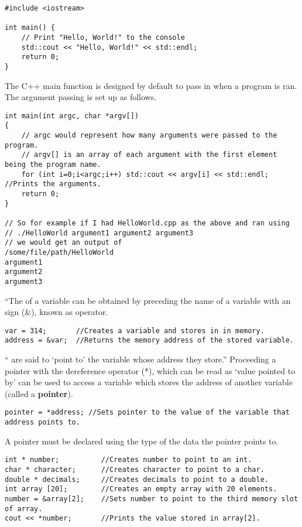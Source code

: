\begin{lstlisting}
#include <iostream>

int main() {
    // Print "Hello, World!" to the console
    std::cout << "Hello, World!" << std::endl;
    return 0;
}
\end{lstlisting}

The C++ main function is designed by default to pass in  when a program is ran. The argument passing is set up as follows.
\begin{lstlisting}
int main(int argc, char *argv[])
{
	// argc would represent how many arguments were passed to the program.
	// argv[] is an array of each argument with the first element being the program name.
	for (int i=0;i<argc;i++) std::cout << argv[i] << std::endl; //Prints the arguments.
	return 0;
}

// So for example if I had HelloWorld.cpp as the above and ran using
// ./HelloWorld argument1 argument2 argument3
// we would get an output of 
/some/file/path/HelloWorld
argument1
argument2
argument3
\end{lstlisting}

``The  of a variable can be obtained by preceding the name of a variable with an  sign (\&), known as  operator. \cite{cpp:pointers}
\begin{lstlisting}
var = 314;       //Creates a variable and stores in in memory.
address = &var;  //Returns the memory address of the stored variable.
\end{lstlisting}

`` are said to `point to' the variable whose address they store.'' \cite{cpp:pointers} Proceeding a pointer with the dereference operator (*), which can be read as `value pointed to by' can be used to access a variable which stores the address of another variable (called a \textbf{pointer}).
\begin{lstlisting}
pointer = *address; //Sets pointer to the value of the variable that address points to.
\end{lstlisting}

A pointer must be declared using the type of the data the pointer points to.
\begin{lstlisting}
int * number;          //Creates number to point to an int.
char * character;      //Creates character to point to a char.
double * decimals;     //Creates decimals to point to a double.
int array [20];        //Creates an empty array with 20 elements.
number = &array[2];    //Sets number to point to the third memory slot of array.
cout << *number;       //Prints the value stored in array[2].
\end{lstlisting}

